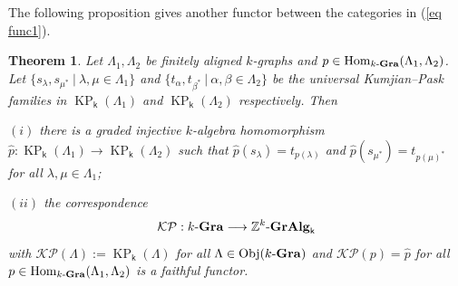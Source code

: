 \documentclass[a4paper,reqno,11pt]{amsart}
\numberwithin{equation}{section}
\newtheorem{thm}{Theorem}[section]
\theoremstyle{definition}
\theoremstyle{remark}
\newcommand{\Obj}{\operatorname{Obj}}
\newcommand{\Hom}{\operatorname{Hom}}
\newcommand{\KP}{\operatorname{KP}}
\begin{document}
The following proposition gives another functor between the categories in (\ref{eq func1}).
\begin{thm}\label{th KP functor}
Let $\Lambda_1,\Lambda_2$ be finitely aligned $k$-graphs and $p\in \Hom_{k\textup{-\textbf{Gra}}}(\Lambda_1,\Lambda_2)$. Let $\{s_\lambda,s_{\mu^*}~|~\lambda,\mu\in \Lambda_1\}$ and $\{t_\alpha,t_{\beta^*}~|~\alpha,\beta\in \Lambda_2\}$ be the universal Kumjian--Pask families in $\KP_\mathsf{k}(\Lambda_1)$ and $\KP_\mathsf{k}(\Lambda_2)$ respectively. Then 

$(i)$ there is a graded injective $k$-algebra homomorphism $\widehat{p}:\KP_\mathsf{k}(\Lambda_1)\longrightarrow \KP_\mathsf{k}(\Lambda_2)$ such that $\widehat{p}(s_\lambda)=t_{p(\lambda)}$ and $\widehat{p}(s_{\mu^*})=t_{p(\mu)^*}$ for all $\lambda,\mu\in \Lambda_1$;

$(ii)$ the correspondence 
\begin{equation}\label{eq func2}
\mathcal{K}\mathcal{P}:k\textup{-\textbf{Gra}}\longrightarrow \mathbb{Z}^k\textup{-\textbf{GrAlg}}_{\mathsf{k}}
\end{equation}
with $\mathcal{K}\mathcal{P}(\Lambda):=\KP_\mathsf{k}(\Lambda)$ for all $\Lambda\in \Obj(k\textup{-\textbf{Gra}})$ and $\mathcal{K}\mathcal{P}(p)=\widehat{p}$ for all $p\in \Hom_{k\textup{-\textbf{Gra}}}(\Lambda_1,\Lambda_2)$ is a faithful functor. 
\end{thm}
\end{document}
